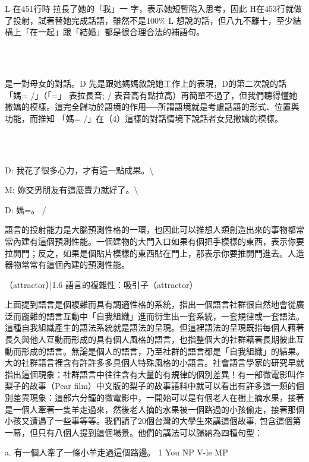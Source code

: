 \begin{styletext}
L 在451行時 拉長了她的「我」一 字，表示她短暫陷入思考，因此 H在453行就做了投射，試著替她完成話語，雖然不是100\%  L 想說的話，但八九不離十，至少結構上「在一起」跟「結婚」都是很合理合法的補語句。
\end{styletext}

\ea%
\label{ex:key:4}
\gll\\
\\
\glt
\z

是一對母女的對話。D 先是跟她媽媽敘說她工作上的表現，D的第二次說的話 「媽= /」（「=」 表拉長音; / 表音高有點拉高）再簡單不過了，但我們聽得懂她撒嬌的模樣。這完全歸功於語境的作用──所謂語境就是考慮話語的形式、位置與功能，而推知 「媽= /」在（4）這樣的對話情境下說話者女兒撒嬌的模樣。

\ea%
\label{ex:key:4}
\gll\\
\\
\glt
\z

D:  我花了很多心力，才有這一點成果。{\textbackslash}

M:  妳交男朋友有這麼賣力就好了。{\textbackslash}

D:  媽=。 /

語言的投射能力是大腦預測性格的一環，也因此可以推想人類創造出來的事物都常常內建有這個預測性能。一個建物的大門入口如果有個把手模樣的東西，表示你要拉開門；反之，如果是個貼片模樣的東西貼在門上，那表示你要推開門進去。人造器物常常有這個內建的預測性能。

（attractor）]{1.6 語言的複雜性：吸引子（attractor）}

上面提到語言是個複雜而具有調適性格的系統，指出一個語言社群很自然地會從廣泛而龐雜的語言互動中「自我組織」進而衍生出一套系統，一套規律或一套語法。這種自我組織產生的語法系統就是語法的呈現。但這裡語法的呈現既指每個人藉著長久與他人互動而形成的具有個人風格的語言，也指整個大的社群藉著長期彼此互動而形成的語言。無論是個人的語言，乃至社群的語言都是「自我組織」的結果。大的社群語言裡含有許許多多具個人特殊風格的小語言。社會語言學家的研究早就指出這個現象：社群語言中往往含有大量的有規律的個別差異！有一部微電影叫作梨子的故事（Pear film）中文版的梨子的故事語料中就可以看出有許多這一類的個別差異現象：這部六分鐘的微電影中，一開始可以是有個老人在樹上摘水果，接著是一個人牽著一隻羊走過來，然後老人摘的水果被一個路過的小孩偷走，接著那個小孩又遭遇了一些事等等。我們請了20個台灣的大學生來講這個故事, 包含這個第一幕，但只有八個人提到這個場景。他們的講法可以歸納為四種句型：

   a.  有一個人牽了一條小羊走過這個路邊。        1   You NP V-le MP

